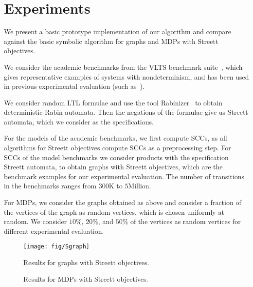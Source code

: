 \section{Experiments}\label{sec:exper}

We present a basic prototype implementation of our algorithm and compare against 
the basic symbolic algorithm for graphs and MDPs with Streett objectives.

\smallskip{}
We consider the academic benchmarks from the VLTS benchmark suite~\cite{VLTS}, which gives
representative examples of systems with nondeterminism, and has been used in previous
experimental evaluation (such as~\cite{BarnatCP11,ChatterjeeHJS13}).

\smallskip{}
We consider random LTL formulae and use the tool Rabinizer~\cite{KomarkovaK14} to 
obtain deterministic Rabin automata. Then the negations of the formulae
give us Streett automata, which we consider as the specifications.

\smallskip{}
For the models of the academic benchmarks, we first compute SCCs, as all 
algorithms for Streett objectives compute SCCs as a preprocessing step. 
For SCCs of the model benchmarks we consider products with the specification Streett
automata, to obtain graphs with Streett objectives, which are the benchmark
examples for our experimental evaluation. The number of transitions in the
benchmarks ranges from $300$K to $5$Million.

\smallskip{}
For MDPs, we consider the graphs obtained as above and consider a 
fraction of the vertices of the graph as random vertices, which is 
chosen uniformly at random. 
We consider $10\%$, $20\%$, and $50\%$ of the vertices as random vertices
for different experimental evaluation.

\setlength{\abovecaptionskip}{1pt}
\begin{figure}[t]
\centering
\texttt{[image: fig/Sgraph]}
\caption{Results for graphs with Streett objectives.}
\label{fig:graphs}
\end{figure}
\setlength{\abovecaptionskip}{6pt}
\begin{figure}[H]
\begin{center}
	\vspace{-2mm}
     \hfill
	\vspace{-2mm}
\caption{Results for MDPs with Streett objectives.}
\label{fig:mdps}
\end{center}
\end{figure}

